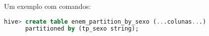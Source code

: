 Um exemplo com comandos:

\begin{lstlisting}[language=sql]
hive> create table enem_partition_by_sexo (...colunas...) 
	  partitioned by (tp_sexo string);
\end{lstlisting}